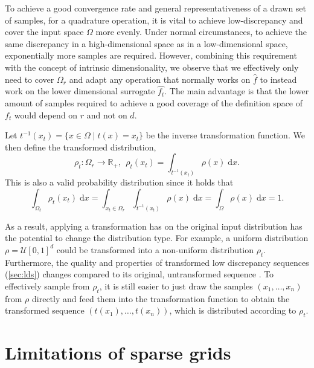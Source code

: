 \documentclass[
  a4paper,  %
  twoside,  %
  bibliography=totoc,
  headsepline,
  cleardoublepage=empty,
  parskip=half,
  draft=false
]{scrbook}
\begin{document}
To achieve a good convergence rate and general representativeness of a drawn set of samples, \eg for a quadrature operation, it is vital to achieve low-discrepancy and cover the input space $\Omega$ more evenly.
Under normal circumstances, to achieve the same discrepancy in a high-dimensional space as in a low-dimensional space,
exponentially more samples are required.
However, combining this requirement with the concept of intrinsic dimensionality, we observe that we effectively only need to cover $\Omega_r$ and adapt any operation that normally works on $\hat{f}$ to instead work on the lower dimensional surrogate $\hat{f_t}$.
The main advantage is that the lower amount of samples required to achieve a good coverage of the definition space of $f_t$ would depend on $r$ and not on $d$.

\begin{definition}
Let $t^{-1}(x_{t})=\{x \in \Omega \mid t(x)=x_{t}\}$ be the inverse transformation function.
We then define the transformed distribution,
\begin{equation}
\rho_t \colon \Omega_r \to \mathds{R_+}, ~~ \rho_t(x_t)=\int_{t^{-1}(x_t)} \rho(x) \; \mathrm{d}x.
\end{equation}
This is also a valid probability distribution since it holds that
\begin{equation}
\int_{\Omega_t} \rho_t(x_t) \; \mathrm{d}x=\int_{x_t \in \Omega_r} \int_{t^{-1}(x_t)} \rho(x) \; \mathrm{d}x = \int_{\Omega} \rho(x) \; \mathrm{d}x = 1.
\end{equation}
\end{definition}
%
As a result, applying a transformation has on the original input distribution has the potential to change the distribution type.
For example, a uniform distribution $\rho=\mathcal{U}[0,1]^d$ could be transformed into a non-uniform distribution $\rho_t$.
Furthermore, the quality and properties of transformed low discrepancy sequences (\cref{sec:lds}) changes compared to its original, untransformed sequence \cite{Wang2008}.
To effectively sample from $\rho_t$, it is still easier to just draw the samples $(x_1, \dots, x_n)$ from $\rho$ directly and feed them into the transformation function to obtain the transformed sequence $(t(x_1), \dots, t(x_n))$, which is distributed according to $\rho_t$.

\section{Limitations of sparse grids}
\end{document}
